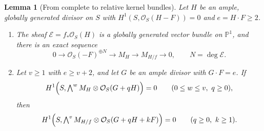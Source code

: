 \documentclass[11pt,reqno]{amsart}
\numberwithin{equation}{section}
\newtheorem{lemma}[lemma]{Lemma}
\theoremstyle{remark}
\newcommand{\sshf}[1]{\mathcal{O}_{#1}}
\newcommand{\shf}[1]{\mathscr{#1}}
\newcommand{\prj}[1]{\mathbb{P}^{#1}}
\begin{document}
\begin{lemma}[From complete to relative kernel bundles]\label{lem:global-relative}
Let \(H\) be an ample, globally generated divisor on \(S\) with \(H^1(S,\sshf{S}(H-F))=0\) and \(e=H\cdot F\geq2\).
\begin{enumerate}
\item The sheaf \(\shf{E}=f_*\sshf{S}(H)\) is a globally generated vector bundle on \(\prj{1}\), and there is an exact sequence
\begin{equation}\label{eq:complete-relative}
 0\longrightarrow\sshf{S}(-F)^{\oplus N}\longrightarrow M_H\longrightarrow M_{H/f}\longrightarrow0,
 \qquad N=\deg\shf{E}.
\end{equation}
\item Let \(v\geq1\) with \(e\geq v+2\), and let \(G\) be an ample divisor with \(G\cdot F=e\). If
\begin{equation}\label{eq:mixed-initial}
 H^1\Bigl(S,\textstyle\bigwedge^wM_H\otimes\sshf{S}(G+qH)\Bigr)=0
 \qquad(0\leq w\leq v,\ q\geq0),
\end{equation}
then
\begin{equation}\label{eq:mixed-relative}
 H^1\Bigl(S,\textstyle\bigwedge^vM_{H/f}\otimes\sshf{S}(G+qH+kF)\Bigr)=0
 \qquad(q\geq0,\ k\geq1).
\end{equation}
\end{enumerate}
\end{lemma}
\end{document}
